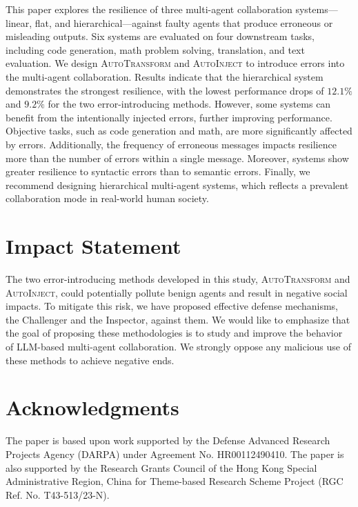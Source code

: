 \documentclass{article}
\theoremstyle{plain}
\theoremstyle{definition}
\theoremstyle{remark}
\begin{document}
This paper explores the resilience of three multi-agent collaboration systems—linear, flat, and hierarchical—against faulty agents that produce erroneous or misleading outputs.
Six systems are evaluated on four downstream tasks, including code generation, math problem solving, translation, and text evaluation.
We design \textsc{AutoTransform} and \textsc{AutoInject} to introduce errors into the multi-agent collaboration.
Results indicate that the hierarchical system demonstrates the strongest resilience, with the lowest performance drops of $12.1\%$ and $9.2\%$ for the two error-introducing methods.
However, some systems can benefit from the intentionally injected errors, further improving performance.
Objective tasks, such as code generation and math, are more significantly affected by errors.
Additionally, the frequency of erroneous messages impacts resilience more than the number of errors within a single message.
Moreover, systems show greater resilience to syntactic errors than to semantic errors.
Finally, we recommend designing hierarchical multi-agent systems, which reflects a prevalent collaboration mode in real-world human society.

\section*{Impact Statement}

The two error-introducing methods developed in this study, \textsc{AutoTransform} and \textsc{AutoInject}, could potentially pollute benign agents and result in negative social impacts.
To mitigate this risk, we have proposed effective defense mechanisms, the Challenger and the Inspector, against them.
We would like to emphasize that the goal of proposing these methodologies is to study and improve the behavior of LLM-based multi-agent collaboration.
We strongly oppose any malicious use of these methods to achieve negative ends.

\section*{Acknowledgments}

The paper is based upon work supported by the Defense Advanced Research Projects Agency (DARPA) under Agreement No. HR00112490410.
The paper is also supported by the Research Grants Council of the Hong Kong Special Administrative Region, China for Theme-based Research Scheme Project (RGC Ref. No. T43-513/23-N).



\end{document}
